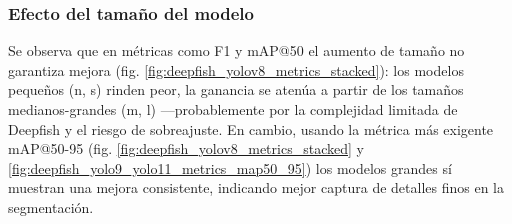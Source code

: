\begin{table}[htbp]
\centering
\caption[Sumario de modelos YOLO a entrenar]{Resumen de cada modelo: capas totales, parámetros, gradients, GFLOPs y número de capas del \textit{backbone} congeladas al realizar TL.}
\label{tab:models_summary_freeze}
\end{table}

\subsubsection{Efecto del tamaño del modelo}
Se observa que en métricas como F1 y mAP@50 el aumento de tamaño no garantiza mejora (fig. \ref{fig:deepfish_yolov8_metrics_stacked}): los modelos pequeños (n, s) rinden peor, la ganancia se atenúa a partir de los tamaños medianos-grandes (m, l) ---probablemente por la complejidad limitada de Deepfish y el riesgo de sobreajuste. En cambio, usando la métrica más exigente mAP@50-95 (fig. \ref{fig:deepfish_yolov8_metrics_stacked} y \ref{fig:deepfish_yolo9_yolo11_metrics_map50_95}) los modelos grandes sí muestran una mejora consistente, indicando mejor captura de detalles finos en la segmentación.

